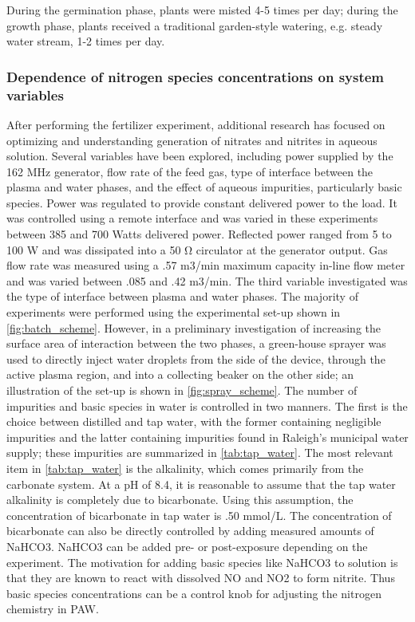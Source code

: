 During the germination phase, plants were misted 4-5 times per day; during the growth phase, plants received a traditional garden-style watering, e.g. steady water stream, 1-2 times per day.

\subsubsection{Dependence of nitrogen species concentrations on system variables}

After performing the fertilizer experiment, additional research has focused on optimizing and understanding generation of nitrates and nitrites in aqueous solution.  Several variables have been explored, including power supplied by the 162 MHz generator, flow rate of the feed gas, type of interface between the plasma and water phases, and the effect of aqueous impurities, particularly basic species.  Power was regulated to provide constant delivered power to the load.  It was controlled using a remote interface and was varied in these experiments between 385 and 700 Watts delivered power.  Reflected power ranged from 5 to 100 W and was dissipated into a 50 Ω circulator at the generator output.  Gas flow rate was measured using a .57 m3/min maximum capacity in-line flow meter and was varied between .085 and .42 m3/min.  The third variable investigated was the type of interface between plasma and water phases.  The majority of experiments were performed using the experimental set-up shown in \cref{fig:batch_scheme}.  However, in a preliminary investigation of increasing the surface area of interaction between the two phases, a green-house sprayer was used to directly inject water droplets from the side of the device, through the active plasma region, and into a collecting beaker on the other side; an illustration of the set-up is shown in \cref{fig:spray_scheme}.  The number of impurities and basic species in water is controlled in two manners.  The first is the choice between distilled and tap water, with the former containing negligible impurities and the latter containing impurities found in Raleigh's municipal water supply; these impurities are summarized in \cref{tab:tap_water}.  The most relevant item in \cref{tab:tap_water} is the alkalinity, which comes primarily from the carbonate system.  At a pH of 8.4, it is reasonable to assume that the tap water alkalinity is completely due to bicarbonate. \cite{benjamin2014water} Using this assumption, the concentration of bicarbonate in tap water is .50 mmol/L.  The concentration of bicarbonate can also be directly controlled by adding measured amounts of NaHCO3.   NaHCO3 can be added pre- or post-exposure depending on the experiment.  The motivation for adding basic species like NaHCO3 to solution is that they are known to react with dissolved NO and NO2 to form nitrite. \cite{greenwood1984chemistry} Thus basic species concentrations can be a control knob for adjusting the nitrogen chemistry in PAW.

